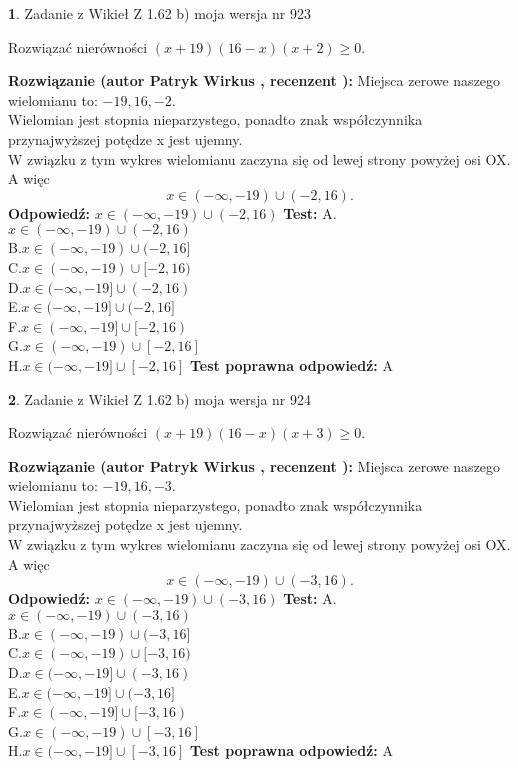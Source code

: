\documentclass[12pt, a4paper]{article}
\theoremstyle{definition} %
\newtheorem{zad}{}
\newcommand{\zadStart}[1]{\begin{zad}#1\newline}
\newcommand{\zadStop}{\end{zad}}
\newcommand{\rozwStart}[2]{\noindent \textbf{Rozwiązanie (autor #1 , recenzent #2): }\newline}
\newcommand{\rozwStop}{\newline}
\newcommand{\odpStart}{\noindent \textbf{Odpowiedź:}\newline}
\newcommand{\odpStop}{\newline}
\newcommand{\testStart}{\noindent \textbf{Test:}\newline}
\newcommand{\testStop}{\newline}
\newcommand{\kluczStart}{\noindent \textbf{Test poprawna odpowiedź:}\newline}
\newcommand{\kluczStop}{\newline}
\begin{document}
\zadStart{Zadanie z Wikieł Z 1.62 b) moja wersja nr 923}

Rozwiązać nierówności $(x+19)(16-x)(x+2)\ge0$.
\zadStop
\rozwStart{Patryk Wirkus}{}
Miejsca zerowe naszego wielomianu to: $-19, 16, -2$.\\
Wielomian jest stopnia nieparzystego, ponadto znak współczynnika przy\linebreak najwyższej potędze x jest ujemny.\\ W związku z tym wykres wielomianu zaczyna się od lewej strony powyżej osi OX. A więc $$x \in (-\infty,-19) \cup (-2,16).$$
\rozwStop
\odpStart
$x \in (-\infty,-19) \cup (-2,16)$
\odpStop
\testStart
A.$x \in (-\infty,-19) \cup (-2,16)$\\
B.$x \in (-\infty,-19) \cup (-2,16]$\\
C.$x \in (-\infty,-19) \cup [-2,16)$\\
D.$x \in (-\infty,-19] \cup (-2,16)$\\
E.$x \in (-\infty,-19] \cup (-2,16]$\\
F.$x \in (-\infty,-19] \cup [-2,16)$\\
G.$x \in (-\infty,-19) \cup [-2,16]$\\
H.$x \in (-\infty,-19] \cup [-2,16]$
\testStop
\kluczStart
A
\kluczStop



\zadStart{Zadanie z Wikieł Z 1.62 b) moja wersja nr 924}

Rozwiązać nierówności $(x+19)(16-x)(x+3)\ge0$.
\zadStop
\rozwStart{Patryk Wirkus}{}
Miejsca zerowe naszego wielomianu to: $-19, 16, -3$.\\
Wielomian jest stopnia nieparzystego, ponadto znak współczynnika przy\linebreak najwyższej potędze x jest ujemny.\\ W związku z tym wykres wielomianu zaczyna się od lewej strony powyżej osi OX. A więc $$x \in (-\infty,-19) \cup (-3,16).$$
\rozwStop
\odpStart
$x \in (-\infty,-19) \cup (-3,16)$
\odpStop
\testStart
A.$x \in (-\infty,-19) \cup (-3,16)$\\
B.$x \in (-\infty,-19) \cup (-3,16]$\\
C.$x \in (-\infty,-19) \cup [-3,16)$\\
D.$x \in (-\infty,-19] \cup (-3,16)$\\
E.$x \in (-\infty,-19] \cup (-3,16]$\\
F.$x \in (-\infty,-19] \cup [-3,16)$\\
G.$x \in (-\infty,-19) \cup [-3,16]$\\
H.$x \in (-\infty,-19] \cup [-3,16]$
\testStop
\kluczStart
A
\kluczStop
\end{document}
